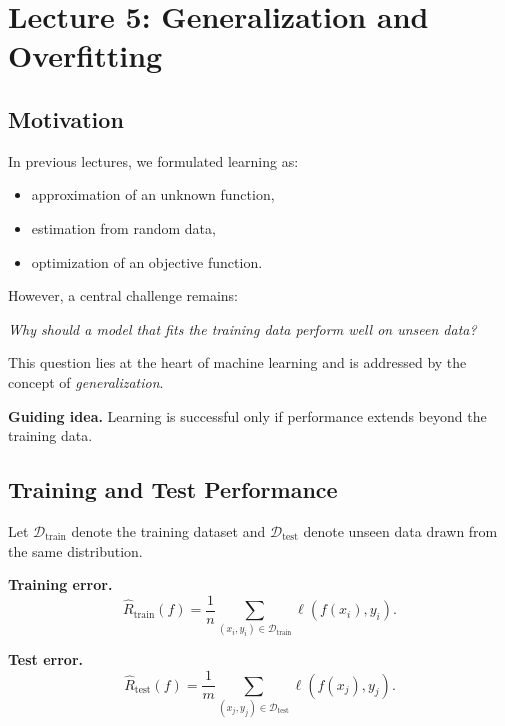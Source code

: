 \section{Lecture 5: Generalization and Overfitting}

\subsection{Motivation}

In previous lectures, we formulated learning as:
\begin{itemize}
    \item approximation of an unknown function,
    \item estimation from random data,
    \item optimization of an objective function.
\end{itemize}

\medskip

\noindent
However, a central challenge remains:

\medskip

\noindent
\textit{Why should a model that fits the training data perform well on unseen data?}

\medskip

\noindent
This question lies at the heart of machine learning and is addressed by the concept of \emph{generalization}.

\medskip

\noindent
\textbf{Guiding idea.}  
Learning is successful only if performance extends beyond the training data.

\subsection{Training and Test Performance}

Let $\mathcal{D}_{\text{train}}$ denote the training dataset and $\mathcal{D}_{\text{test}}$ denote unseen data drawn from the same distribution.

\medskip

\noindent
\textbf{Training error.}
\[
\hat{R}_{\text{train}}(f) = \frac{1}{n} \sum_{(x_i,y_i)\in \mathcal{D}_{\text{train}}} \ell(f(x_i), y_i).
\]

\medskip

\noindent
\textbf{Test error.}
\[
\hat{R}_{\text{test}}(f) = \frac{1}{m} \sum_{(x_j,y_j)\in \mathcal{D}_{\text{test}}} \ell(f(x_j), y_j).
\]

\medskip

